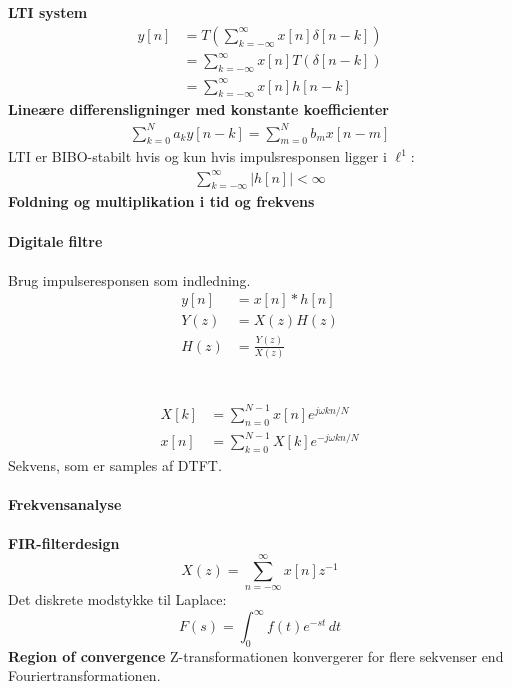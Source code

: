\documentclass[12pt,a4paper]{report}
\author{Frederik Appel Vardinghus-Nielsen}
\begin{document}
\\\\
\textbf{LTI system}
\begin{align*}
y[n]&=T\left(\sum_{k=-\infty}^{\infty}x[n]\delta[n-k]\right)\\
&=\sum_{k=-\infty}^{\infty}x[n]T\left(\delta[n-k]\right)\\
&=\sum_{k=-\infty}^{\infty}x[n]h[n-k]
\end{align*}
\textbf{Lineære differensligninger med konstante koefficienter}
\begin{align*}
\sum_{k=0}^Na_ky[n-k]=\sum_{m=0}^Nb_mx[n-m]
\end{align*}
LTI er BIBO-stabilt hvis og kun hvis impulsresponsen ligger i $\ell^1$:
\begin{align*}
\sum_{k=-\infty}^{\infty}|h[n]|<\infty
\end{align*}
\textbf{Foldning og multiplikation i tid og frekvens}\\\\
\textbf{Digitale filtre}
\clearpage
{}\\\\
Brug impulseresponsen som indledning.
\begin{align*}
y[n]&=x[n]*h[n]\\
Y(z)&=X(z)H(z)\\
H(z)&=\frac{Y(z)}{X(z)}
\end{align*}
\clearpage
{}\\\\
\begin{align*}
X[k]&=\sum_{n=0}^{N-1}x[n]e^{j\omega kn/N}\\
x[n]&=\sum_{k=0}^{N-1}X[k]e^{-j\omega kn/N}
\end{align*}
Sekvens, som er samples af DTFT.\\\\
\textbf{Frekvensanalyse}\\\\
\textbf{FIR-filterdesign}
\clearpage
{}
\begin{equation}
X(z)=\sum_{n=-\infty}^{\infty}x[n]z^{-1}
\end{equation}
Det diskrete modstykke til Laplace:
\begin{equation}
F(s)=\int_0^{\infty}\!f(t)e^{-st}\,dt
\end{equation}
\textbf{Region of convergence} Z-transformationen konvergerer for flere sekvenser end Fouriertransformationen.
\end{document}
